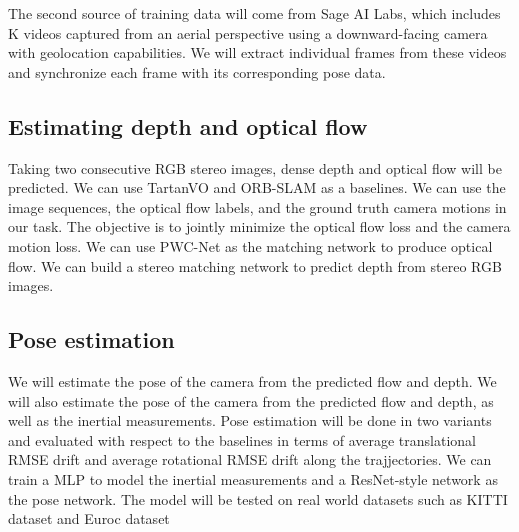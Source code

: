 \documentclass[10pt,letterpaper]{article}
\begin{document}
The second source of training data will come from Sage AI Labs, which includes K videos captured from an aerial perspective using a downward-facing camera with geolocation capabilities. We will extract individual frames from these videos and synchronize each frame with its corresponding pose data.

\subsection*{Estimating depth and optical flow}
Taking two consecutive RGB stereo images, dense depth and optical flow will be predicted. We can use TartanVO and ORB-SLAM \cite{orb} as a baselines. We can use the image sequences, the optical flow labels, and the ground truth camera motions in our task. The objective is to jointly minimize the optical flow loss and the camera motion loss. We can use PWC-Net as the matching network to produce optical flow. We can build a stereo matching network to predict depth from stereo RGB images.

\subsection*{Pose estimation}
We will estimate the pose of the camera from the predicted flow and depth. We will also estimate the pose of the camera from the predicted flow and depth, as well as the inertial measurements. Pose estimation will be done in two variants and evaluated with respect to the baselines in terms of  average translational RMSE drift and average rotational RMSE drift along the trajjectories. We can train a MLP to model the inertial measurements and a ResNet-style network as the pose network. The model will be tested on real world datasets such as KITTI dataset \cite{kitti} and Euroc dataset \cite{euroc}
\end{document}
